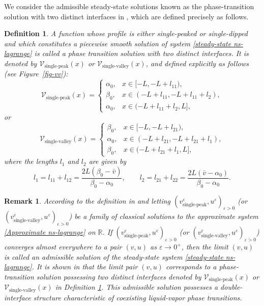 \documentclass[a4paper,oneside,11pt]{article}
\numberwithin{equation}{section}
\newtheorem{definition}{Definition}[section]
\newtheorem{remark}{Remark}[section]
\begin{document}
We consider the admissible steady-state solutions known as the phase-transition solution with two distinct interfaces in \cite{chnys2026}, which are defined precisely as follows.
\begin{definition}\label{phase transition solution with two distinct interfaces}
 A function whose profile is either single-peaked or single-dipped and which constitutes a piecewise smooth solution of system \eqref{steady-state ns-lagrange} is called a phase transition solution with two distinct interfaces. It is denoted by $\mathscr{V}_{\mathrm{single\text{-}peak}}(x)$ or $\mathscr{V}_{\mathrm{single\text{-}valley}}(x)$, and defined explicitly as follows (see Figure~\ref{fig-vv}):
\begin{equation}\label{Phase-transition-solution-1}
  \mathscr{V}_{\mathrm{single\text{-}peak}}(x)=\begin{cases}
  \alpha_0, & x\in[-L,-L+l_{11}),\\
  \beta_0, & x\in (-L+l_{11},-L+l_{11}+l_2),\\
  \alpha_0, & x\in(-L+l_{11}+l_2, L],
\end{cases}
\end{equation}
or
\begin{equation}\label{Phase-transition-solution-2}
  \mathscr{V}_{\mathrm{single\text{-}valley}}(x)=\begin{cases}
  \beta_0, & x\in[-L,-L+l_{21}),\\
  \alpha_0, &  x\in (-L+l_{21},-L+l_{21}+l_1),\\
  \beta_0, &  x\in(-L+l_{21}+l_1, L],
\end{cases}
\end{equation}
where the lengths $l_1$ and $l_2$ are given by
\begin{equation}\label{lii}
  l_1 = l_{11}+l_{12}=\frac{2L(\beta_0-\bar{v})}{\beta_0-\alpha_0},\qquad 
  l_2 = l_{21}+l_{22}=\frac{2L(\bar{v}-\alpha_0)}{\beta_0-\alpha_0}.
\end{equation}
\end{definition}

\begin{remark}
According to the definition in \cite{chnys2026} and letting ${(v^\varepsilon_{\text{single-peak}}, u^\varepsilon)}_{\varepsilon>0}$ (or ${(v^\varepsilon_{\text{single-valley}}, u^\varepsilon)}_{\varepsilon>0}$) be a family of classical solutions to the approximate system \eqref{Approximate ns-lagrange} on $\mathbb{R}$. If ${(v^\varepsilon_{\text{single-peak}}, u^\varepsilon)}_{\varepsilon>0}$ (or ${(v^\varepsilon_{\text{single-valley}}, u^\varepsilon)}_{\varepsilon>0}$) converges almost everywhere to a pair $(v, u)$ as $\varepsilon \to 0^+$, then the limit $(v, u)$ is called an admissible solution of the steady-state system \eqref{steady-state ns-lagrange}. It is shown in \cite{chnys2026} that the limit pair \((v,u)\) corresponds to a phase-transition solution possessing two distinct interfaces denoted by $\mathscr{V}_{\mathrm{single\text{-}peak}}(x)$ or $\mathscr{V}_{\mathrm{single\text{-}valley}}(x)$ in Definition \ref{phase transition solution with two distinct interfaces}. 
This admissible solution possesses a double-interface structure characteristic of coexisting liquid-vapor phase transitions.
\end{remark}
\end{document}
